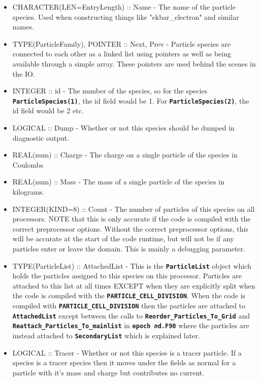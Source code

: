 \documentclass[12pt,a4paper]{article}
\newcommand{\inlinecode}[1]{{\color{warwickred} \bf\texttt{#1}}}
\begin{document}
\begin{itemize}
\item CHARACTER(LEN=EntryLength) :: Name - The name of the particle
  species. Used when constructing things like "ekbar\_electron" and similar
  names.
\item TYPE(ParticleFamily), POINTER :: Next, Prev - Particle species are
  connected to each other as a linked list using pointers as well as being
  available through a simple array. These pointers are used behind the scenes
  in the IO.
\item INTEGER :: id - The number of the species, so for the species
  \inlinecode{ParticleSpecies(1)}, the id field would be 1. For
  \inlinecode{ParticleSpecies(2)}, the id field would be 2 etc.
\item LOGICAL :: Dump - Whether or not this species should be dumped in
  diagnostic output.
\item REAL(num) :: Charge - The charge on a single particle of the species in
  Coulombs
\item REAL(num) :: Mass - The mass of a single particle of the species in
  kilograms.
\item INTEGER(KIND=8) :: Count - The number of particles of this species on
  all processors. NOTE that this is only accurate if the code is compiled with
  the correct preprocessor options. Without the correct preprocessor options,
  this will be accurate at the start of the code runtime, but will not be if
  any particles enter or leave the domain. This is mainly a debugging
  parameter.
\item TYPE(ParticleList) :: AttachedList - This is the
  \inlinecode{ParticleList} object which holds the particles assigned to this
  species on this processor. Particles are attached to this list at all times
  EXCEPT when they are explicitly split when the code is compiled with the
  \inlinecode{PARTICLE\_CELL\_DIVISION}. When the code is compiled with
  \inlinecode{PARTICLE\_CELL\_DIVISION} then the particles are attached to
  \inlinecode{AttachedList} except between the calls to
  \inlinecode{Reorder\_Particles\_To\_Grid} and
  \inlinecode{Reattach\_Particles\_To\_mainlist} in \inlinecode{epoch{\it
      n}d.F90} where the particles are instead attached to
  \inlinecode{SecondaryList} which is explained later.
\item LOGICAL :: Tracer - Whether or not this species is a tracer particle. If
  a species is a tracer species then it moves under the fields as normal for a
  particle with it's mass and charge but contributes no current.

\end{itemize}
\end{document}
